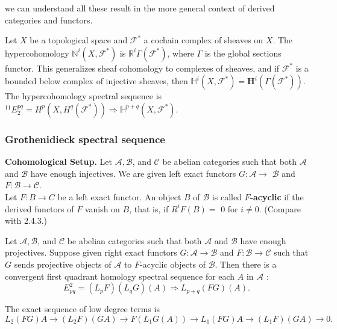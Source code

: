 we can understand all these result in the more general context of derived categories and functors.\\

\begin{example} 
Let $X$ be a topological space and $\mathcal{F}^*$ a cochain complex of sheaves on $X$. The hypercohomology $\mathbb{N}^i\left(X, \mathcal{F}^*\right)$ is $\mathbb{R}^i \Gamma\left(\mathcal{F}^*\right)$, where $\Gamma$ is the global sections functor. This generalizes sheaf cohomology to complexes of sheaves, and if $\mathcal{F}^*$ is a bounded below complex of injective sheaves, then $\mathbb{H}^i\left(X, \mathcal{F}^*\right)=\boldsymbol{H}^i\left(\Gamma\left(\mathcal{F}^*\right)\right)$. The hypercohomology spectral sequence is ${ }^{11} E_2^{p q}=H^p\left(X, H^q\left(\mathcal{F}^*\right)\right) \Rightarrow \mathbb{H}^{p+q}\left(X, \mathcal{F}^*\right)$.
\end{example}    

\subsubsection*{Grothenidieck spectral sequence}

\textbf{Cohomological Setup.} Let $\mathcal{A}, \mathcal{B}$, and $\mathcal{C}$ be abelian categories such that both $\mathcal{A}$ and $\mathcal{B}$ have enough injectives. We are given left exact functors $G: \mathcal{A} \rightarrow$ $\mathcal{B}$ and $F: \mathcal{B} \rightarrow \mathcal{C}$.\\

Let $F: B \rightarrow C$ be a left exact functor. An object $B$ of $\mathcal{B}$ is called \textbf{$F$-acyclic} if the derived functors of $F$ vanish on $B$, that is, if $R^i F(B)=$ 0 for $i \neq 0$. (Compare with 2.4.3.)

\begin{theo}
Let $\mathcal{A}, \mathcal{B}$, and $\mathcal{C}$ be abelian categories such that both $\mathcal{A}$ and $\mathcal{B}$ have enough projectives. Suppose given right exact functors $G: \mathcal{A} \rightarrow \mathcal{B}$ and $F: \mathcal{B} \rightarrow \mathcal{C}$ such that $G$ sends projective objects of $\mathcal{A}$ to $F$-acyclic objects of $\mathcal{B}$. Then there is a convergent first quadrant homology spectral sequence for each $A$ in $\mathcal{A}$ :
    $$
    E_{p q}^2=\left(L_p F\right)\left(L_q G\right)(A) \Rightarrow L_{p+q}(F G)(A) .
    $$
    
    The exact sequence of low degree terms is
    $$
    L_2(F G) A \rightarrow\left(L_2 F\right)(G A) \rightarrow F\left(L_1 G(A)\right) \rightarrow L_1(F G) A \rightarrow\left(L_1 F\right)(G A) \rightarrow 0 .
    $$
\end{theo} 


